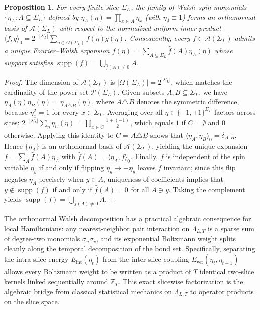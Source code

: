 \documentclass[11pt]{article}
\newtheorem{proposition}[theorem]{Proposition}
\theoremstyle{definition}
\begin{document}
\begin{proposition}
\label{prop:s01-cylinder-density}
For every finite slice $\Sigma_L$, the family of Walsh--spin monomials $\{\eta_A : A
\subseteq \Sigma_L\}$ defined by $\eta_A(\eta) = \prod_{x \in A} \eta_x$ (with
$\eta_\emptyset \equiv 1$) forms an orthonormal basis of $\mathcal{A}(\Sigma_L)$
with respect to the normalized uniform inner product $\langle f, g \rangle_0 =
2^{-|\Sigma_L|} \sum_{\eta \in \Omega(\Sigma_L)} \overline{f(\eta)} g(\eta)$.
Consequently, every $f \in \mathcal{A}(\Sigma_L)$ admits a unique Fourier--Walsh
expansion $f(\eta) = \sum_{A \subseteq \Sigma_L} \widehat{f}(A) \eta_A(\eta)$ whose
support satisfies $\operatorname{supp}(f) = \bigcup_{\widehat{f}(A) \neq 0} A$.
\end{proposition}
\begin{proof}
The dimension of $\mathcal{A}(\Sigma_L)$ is $|\Omega(\Sigma_L)| = 2^{|\Sigma_L|}$,
which matches the cardinality of the power set $\mathcal{P}(\Sigma_L)$. Given
subsets $A, B \subseteq \Sigma_L$, we have $\eta_A(\eta) \eta_B(\eta) = \eta_{A
\triangle B}(\eta)$, where $A \triangle B$ denotes the symmetric difference, because
$\eta_x^2 = 1$ for every $x \in \Sigma_L$. Averaging over all $\eta \in \{-1,
+1\}^{\Sigma_L}$ factors across sites: $2^{-|\Sigma_L|} \sum_{\eta} \eta_C(\eta) =
\prod_{x \in C} \frac{1 + (-1)}{2}$, which equals $1$ if $C = \emptyset$ and $0$
otherwise. Applying this identity to $C = A \triangle B$ shows that $\langle \eta_A,
\eta_B \rangle_0 = \delta_{A,B}$. Hence $\{\eta_A\}$ is an orthonormal basis of
$\mathcal{A}(\Sigma_L)$, yielding the unique expansion $f = \sum_A \widehat{f}(A)
\eta_A$ with $\widehat{f}(A) = \langle \eta_A, f \rangle_0$. Finally, $f$ is
independent of the spin variable $\eta_y$ if and only if flipping $\eta_y \mapsto
-\eta_y$ leaves $f$ invariant; since this flip negates $\eta_A$ precisely when $y
\in A$, uniqueness of coefficients implies that $y \notin \operatorname{supp}(f)$ if
and only if $\widehat{f}(A) = 0$ for all $A \ni y$. Taking the complement yields
$\operatorname{supp}(f) = \bigcup_{\widehat{f}(A) \neq 0} A$.
\end{proof}

The orthonormal Walsh decomposition has a practical algebraic consequence for local
Hamiltonians: any nearest-neighbor pair interaction on $\Lambda_{L,T}$ is a sparse
sum of degree-two monomials $\sigma_u \sigma_v$, and its exponential Boltzmann
weight splits cleanly along the temporal decomposition of the bond set.
Specifically, separating the intra-slice energy $E_{\mathrm{int}}(\eta_t)$ from the
inter-slice coupling $E_{\mathrm{ver}}(\eta_t, \eta_{t+1})$ allows every Boltzmann
weight to be written as a product of $T$ identical two-slice kernels linked
sequentially around $\mathbb{Z}_T$. This exact slicewise factorization is the
algebraic bridge from classical statistical mechanics on $\Lambda_{L,T}$ to operator
products on the slice space.
\end{document}
